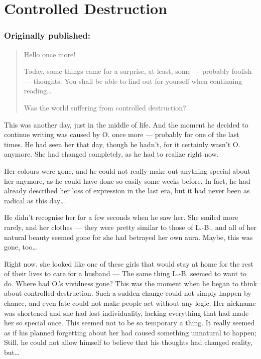 \chapter{Controlled Destruction}
\label{cha:contr-destr}
\subsection*{Originally published: }
\begin{quote}
Hello once more! 

Today, some things came for a surprise, at least, some --- probably foolish --- thoughts. You shall be able to find out for yourself when continuing reading\dots{}

Was the world suffering from controlled destruction?
\end{quote}

This was another day, just in the middle of life. And the moment he decided to continue writing was caused by O. once more --- probably for one of the last times. 
He had seen her that day, though he hadn't, for it certainly wasn't O. anymore. She had changed completely, as he had to realize right now.

Her colours were gone, and he could not really make out anything special about her anymore, as he could have done so easily some weeks before. In fact, he had already described her loss of expression in the last era, but it had never been as radical as this day\dots{}

He didn't recognise her for a few seconds when he saw her. She smiled more rarely, and her clothes --- they were pretty similar to those of L.-B., and all of her natural beauty seemed gone for she had betrayed her own aura. Maybe, this was gone, too\dots{}

Right now, she looked like one of these girls that would stay at home for the rest of their lives to care for a husband --- The same thing L.-B. seemed to want to do. Where had O.'s vividness gone? 
This was the moment when he began to think about controlled destruction. Such a sudden change could not simply happen by chance, and even fate could not make people act without any logic. Her nickname was shortened and she had lost individuality, lacking everything that had made her so special once. This seemed not to be so temporary a thing. It really seemed as if his planned forgetting about her had caused something unnatural to happen; Still, he could not allow himself to believe that his thoughts had changed reality, but\dots{}

